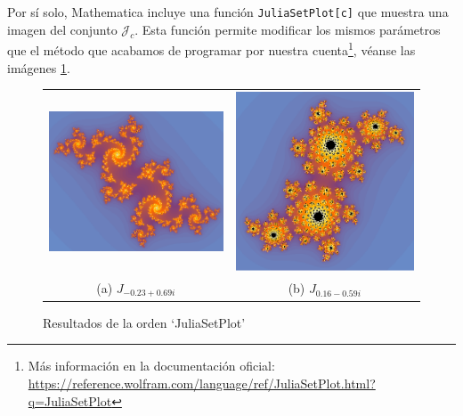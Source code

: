 Por sí solo, Mathematica incluye una función \verb|JuliaSetPlot[c]| que muestra una imagen del conjunto $\mathcal{J}_c$. Esta función permite modificar los mismos parámetros que el método que acabamos de programar por nuestra cuenta\footnote{Más información en la documentación oficial: \url{https://reference.wolfram.com/language/ref/JuliaSetPlot.html?q=JuliaSetPlot}}, véanse las imágenes \ref{fig:julia-set-plot}.

\begin{figure}[ht]
  \centering
  \begin{tabular}{cc}
    \includegraphics[scale=0.4]{./img/C3/juliaSetPlot-1.png} &   \includegraphics[scale=0.3]{./img/C3/juliaSetPlot-2.png} \\
  (a) $J_{-0.23+0.69i}$ & (b) $J_{0.16-0.59i}$  \\[6pt]
  \end{tabular}
  \caption{Resultados de la orden `JuliaSetPlot'}
  \label{fig:julia-set-plot}
\end{figure}

